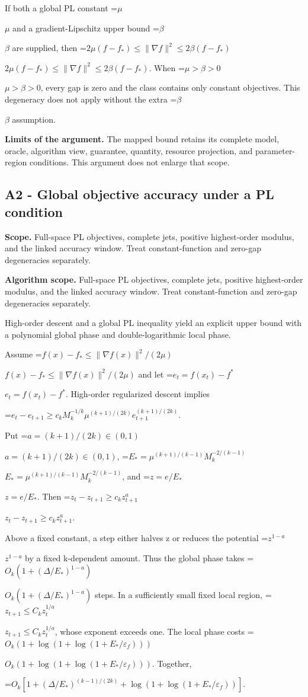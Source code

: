 \documentclass[10pt,a4paper]{article}
\newcommand{\AtlasMath}[1]{\par\begingroup\centering\setbox0=\hbox{$\displaystyle #1$}\ifdim\wd0>1.4\linewidth\typeout{ATLAS WIDE FORMULA: \the\wd0}\fi\ifdim\wd0>\linewidth\resizebox{\linewidth}{!}{\box0}\else\box0\fi\par\endgroup}
\newcommand{\AtlasInlineMath}[1]{\begingroup\setbox0=\hbox{$#1$}\ifdim\wd0>.4\linewidth\endgroup\AtlasMath{#1}\else\endgroup$#1$\fi}
\begin{document}
If both a global PL constant \AtlasInlineMath{\mu} and a gradient-Lipschitz upper bound \AtlasInlineMath{\beta} are supplied, then \AtlasInlineMath{2\mu(f-f_*)\le\|\nabla f\|^2\le2\beta(f-f_*)}. When \AtlasInlineMath{\mu>\beta>0}, every gap is zero and the class contains only constant objectives. This degeneracy does not apply without the extra \AtlasInlineMath{\beta} assumption.

\textbf{Limits of the argument.} The mapped bound retains its complete model, oracle, algorithm view, guarantee, quantity, resource projection, and parameter-region conditions. This argument does not enlarge that scope.

\subsection{A2 - Global objective accuracy under a PL condition}
\textbf{Scope.} Full-space PL objectives, complete jets, positive highest-order modulus, and the linked accuracy window. Treat constant-function and zero-gap degeneracies separately.

\textbf{Algorithm scope.} Full-space PL objectives, complete jets, positive highest-order modulus, and the linked accuracy window. Treat constant-function and zero-gap degeneracies separately.

High-order descent and a global PL inequality yield an explicit upper bound with a polynomial global phase and double-logarithmic local phase.

Assume \AtlasInlineMath{f(x)-f_*\le\|\nabla f(x)\|^2/(2\mu)} and let \AtlasInlineMath{e_t=f(x_t)-f^*}. High-order regularized descent implies

\AtlasMath{e_t-e_{t+1}\ge c_kM_k^{-1/k}\mu^{(k+1)/(2k)}e_{t+1}^{(k+1)/(2k)}.}

Put \AtlasInlineMath{a=(k+1)/(2k)\in(0,1)}, \AtlasInlineMath{E_* =\mu^{(k+1)/(k-1)}M_k^{-2/(k-1)}}, and \AtlasInlineMath{z=e/E_*}. Then \AtlasInlineMath{z_t-z_{t+1}\ge c_kz_{t+1}^a}.

Above a fixed constant, a step either halves z or reduces the potential \AtlasInlineMath{z^{1-a}} by a fixed k-dependent amount. Thus the global phase takes \AtlasInlineMath{O_k(1+(\Delta/E_*)^{1-a})} steps. In a sufficiently small fixed local region, \AtlasInlineMath{z_{t+1}\le C_kz_t^{1/a}}, whose exponent exceeds one. The local phase costs \AtlasInlineMath{O_k(1+\log(1+\log(1+E_*/\varepsilon_f)))}. Together,

\AtlasMath{O_k\left[1+(\Delta/E_*)^{(k-1)/(2k)}+\log(1+\log(1+E_*/\varepsilon_f))\right].}
\end{document}
